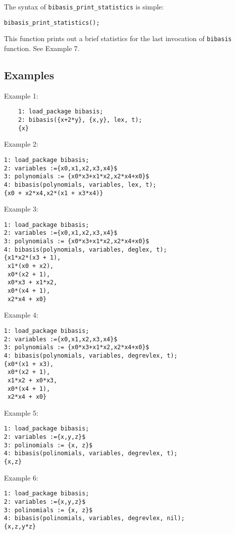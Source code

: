 \noindent The syntax of \texttt{bibasis\_print\_statistics} is simple:
\begin{center}
    \texttt{bibasis\_print\_statistics();}
\end{center}
This function prints out a brief statistics for the last invocation of \texttt{bibasis} function. See Example 7.

\subsection{Examples}


Example 1:
\begin{verbatim}
    1: load_package bibasis;
    2: bibasis({x+2*y}, {x,y}, lex, t);
    {x}

\end{verbatim}

\noindent Example 2:
\begin{verbatim}
1: load_package bibasis;
2: variables :={x0,x1,x2,x3,x4}$
3: polynomials := {x0*x3+x1*x2,x2*x4+x0}$
4: bibasis(polynomials, variables, lex, t);
{x0 + x2*x4,x2*(x1 + x3*x4)}

\end{verbatim}

\noindent Example 3:
\begin{verbatim}
1: load_package bibasis;
2: variables :={x0,x1,x2,x3,x4}$
3: polynomials := {x0*x3+x1*x2,x2*x4+x0}$
4: bibasis(polynomials, variables, deglex, t);
{x1*x2*(x3 + 1),
 x1*(x0 + x2),
 x0*(x2 + 1),
 x0*x3 + x1*x2,
 x0*(x4 + 1),
 x2*x4 + x0}

\end{verbatim}

\noindent Example 4:
\begin{verbatim}
1: load_package bibasis;
2: variables :={x0,x1,x2,x3,x4}$
3: polynomials := {x0*x3+x1*x2,x2*x4+x0}$
4: bibasis(polynomials, variables, degrevlex, t);
{x0*(x1 + x3),
 x0*(x2 + 1),
 x1*x2 + x0*x3,
 x0*(x4 + 1),
 x2*x4 + x0}

\end{verbatim}

\newpage

\noindent Example 5:
\begin{verbatim}
1: load_package bibasis;
2: variables :={x,y,z}$
3: polinomials := {x, z}$
4: bibasis(polinomials, variables, degrevlex, t);
{x,z}

\end{verbatim}

\noindent Example 6:
\begin{verbatim}
1: load_package bibasis;
2: variables :={x,y,z}$
3: polinomials := {x, z}$
4: bibasis(polinomials, variables, degrevlex, nil);
{x,z,y*z}

\end{verbatim}

